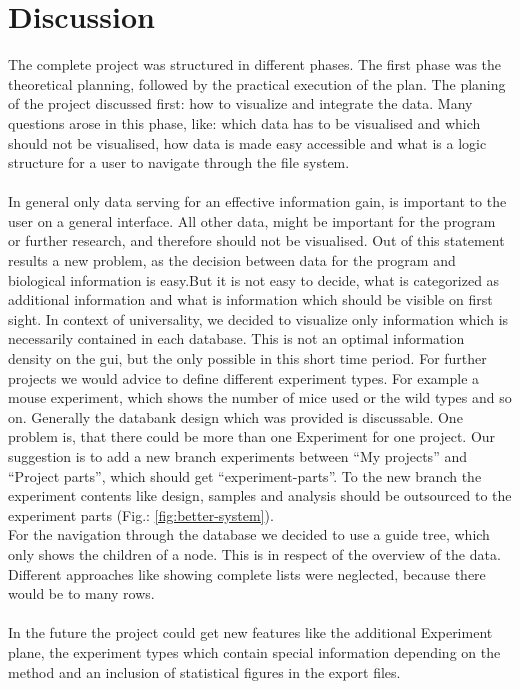 \documentclass[a4paper, 11pt]{article}
\begin{document}
\section{Discussion}
The complete project was structured in different phases. The first phase was the theoretical planning, followed by the practical execution of the plan. The planing of the project discussed first: how to visualize and integrate the data. Many questions arose in this phase, like: which data has to be visualised and which should not be visualised, how data is made easy accessible and what is a logic structure for a user to navigate through the file system.\\
\\
In general only data serving for an effective information gain, is important to the user on a general interface. All other data, might be important for the program or further research, and therefore should not be visualised. Out of this statement results a new problem, as the decision between data for the program and biological information is easy.But it is not easy to decide, what is categorized as additional information and what is information which should be visible on first sight. In context of universality, we decided to visualize only information which is necessarily contained in each database. This is not an optimal information density on the gui, but the only possible in this short time period. For further projects we would advice to define different experiment types. For example a mouse experiment, which shows the number of mice used or the wild types and so on.
Generally the databank design which was provided is discussable. One problem is, that there could be more than one Experiment for one project. Our suggestion is to add a new branch experiments between “My projects” and “Project parts”, which should get “experiment-parts”. To the new branch the experiment contents like design, samples and analysis should be outsourced to the experiment parts (Fig.: \ref{fig:better-system}).\\
For the navigation through the database we decided to use a guide tree, which only shows the children of a node. This is in respect of the overview of the data. Different approaches like showing complete lists were neglected, because there would be to many rows.\\
\\
In the future the project could get new features like the additional Experiment plane, the experiment types which contain special information depending on the method and an inclusion of statistical figures in the export files.
\end{document}
